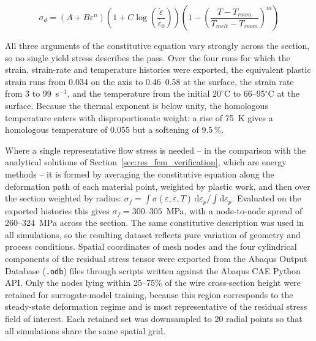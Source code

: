 \documentclass[subscriptcorrection,upint,varvw,barcolor=Goldenrod3,mathalfa=cal=euler,balance,hyphenate,french,pdf-a]{asmejour} %
\begin{document}
\begin{equation}
\sigma_d = (A+B\varepsilon^n)(1+C\log(\frac{\dot{\varepsilon}}{\dot{\varepsilon_{0}}}))(1-(\frac{T-T_{room}}{T_{melt}-T_{room}})^m)\label{eq3}
\end{equation}


All three arguments of the constitutive equation vary strongly across the section, so no
single yield stress describes the pass. Over the four runs for which the strain, strain-rate
and temperature histories were exported, the equivalent plastic strain runs from 0.034 on the
axis to 0.46--0.58 at the surface, the strain rate from 3 to 99~s$^{-1}$, and the temperature
from the initial $20^\circ$C to 66--95$^\circ$C at the surface. Because the thermal exponent
is below unity, the homologous temperature enters with disproportionate weight: a rise of
75~K gives a homologous temperature of 0.055 but a softening of 9.5\,\%.

Where a single representative flow stress is needed -- in the comparison with the analytical
solutions of Section~\ref{sec:res_fem_verification}, which are energy methods -- it is formed
by averaging the constitutive equation along the deformation path of each material point,
weighted by plastic work, and then over the section weighted by radius:
$\sigma_f = \int\sigma(\varepsilon,\dot{\varepsilon},T)\,\mathrm{d}\varepsilon_p /
\int\mathrm{d}\varepsilon_p$. Evaluated on the exported histories this gives
$\sigma_f = 300$--$305$~MPa, with a node-to-node spread of 260--324~MPa across the section.
The same constitutive description was used in all simulations, so the resulting dataset reflects pure variation of geometry and process conditions. Spatial coordinates of mesh nodes and the four cylindrical components of the residual stress tensor were exported from the Abaqus Output Database (\texttt{.odb}) files through scripts written against the Abaqus CAE Python API. Only the nodes lying within 25--75\% of the wire cross-section height were retained for surrogate-model training, because this region corresponds to the steady-state deformation regime and is most representative of the residual stress field of interest. Each retained set was downsampled to 20 radial points so that all simulations share the same spatial grid.
\end{document}
